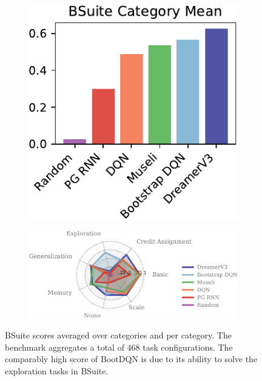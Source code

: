 \begin{figure}[h!]
\captionsetup[subfigure]{justification=centering}
\centering%
\begin{subfigure}[c]{0.31\linewidth}
\centering%
\includegraphics[width=\linewidth]{bsuite/bsuite}%
\end{subfigure}\hfill
\begin{subfigure}[c]{0.67\linewidth}
\centering%
\includegraphics[width=\linewidth]{bsuite/radar}%
\end{subfigure}%
\caption{BSuite scores averaged over categories and per category. The benchmark aggregates a total of 468 task configurations. The comparably high score of BootDQN is due to its ability to solve the exploration tasks in BSuite.}
\label{fig:bsuite}
\end{figure}
